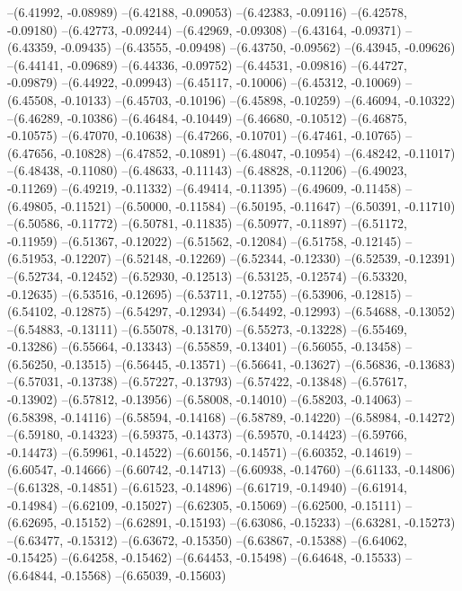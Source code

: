 --(6.41992, -0.08989)
--(6.42188, -0.09053)
--(6.42383, -0.09116)
--(6.42578, -0.09180)
--(6.42773, -0.09244)
--(6.42969, -0.09308)
--(6.43164, -0.09371)
--(6.43359, -0.09435)
--(6.43555, -0.09498)
--(6.43750, -0.09562)
--(6.43945, -0.09626)
--(6.44141, -0.09689)
--(6.44336, -0.09752)
--(6.44531, -0.09816)
--(6.44727, -0.09879)
--(6.44922, -0.09943)
--(6.45117, -0.10006)
--(6.45312, -0.10069)
--(6.45508, -0.10133)
--(6.45703, -0.10196)
--(6.45898, -0.10259)
--(6.46094, -0.10322)
--(6.46289, -0.10386)
--(6.46484, -0.10449)
--(6.46680, -0.10512)
--(6.46875, -0.10575)
--(6.47070, -0.10638)
--(6.47266, -0.10701)
--(6.47461, -0.10765)
--(6.47656, -0.10828)
--(6.47852, -0.10891)
--(6.48047, -0.10954)
--(6.48242, -0.11017)
--(6.48438, -0.11080)
--(6.48633, -0.11143)
--(6.48828, -0.11206)
--(6.49023, -0.11269)
--(6.49219, -0.11332)
--(6.49414, -0.11395)
--(6.49609, -0.11458)
--(6.49805, -0.11521)
--(6.50000, -0.11584)
--(6.50195, -0.11647)
--(6.50391, -0.11710)
--(6.50586, -0.11772)
--(6.50781, -0.11835)
--(6.50977, -0.11897)
--(6.51172, -0.11959)
--(6.51367, -0.12022)
--(6.51562, -0.12084)
--(6.51758, -0.12145)
--(6.51953, -0.12207)
--(6.52148, -0.12269)
--(6.52344, -0.12330)
--(6.52539, -0.12391)
--(6.52734, -0.12452)
--(6.52930, -0.12513)
--(6.53125, -0.12574)
--(6.53320, -0.12635)
--(6.53516, -0.12695)
--(6.53711, -0.12755)
--(6.53906, -0.12815)
--(6.54102, -0.12875)
--(6.54297, -0.12934)
--(6.54492, -0.12993)
--(6.54688, -0.13052)
--(6.54883, -0.13111)
--(6.55078, -0.13170)
--(6.55273, -0.13228)
--(6.55469, -0.13286)
--(6.55664, -0.13343)
--(6.55859, -0.13401)
--(6.56055, -0.13458)
--(6.56250, -0.13515)
--(6.56445, -0.13571)
--(6.56641, -0.13627)
--(6.56836, -0.13683)
--(6.57031, -0.13738)
--(6.57227, -0.13793)
--(6.57422, -0.13848)
--(6.57617, -0.13902)
--(6.57812, -0.13956)
--(6.58008, -0.14010)
--(6.58203, -0.14063)
--(6.58398, -0.14116)
--(6.58594, -0.14168)
--(6.58789, -0.14220)
--(6.58984, -0.14272)
--(6.59180, -0.14323)
--(6.59375, -0.14373)
--(6.59570, -0.14423)
--(6.59766, -0.14473)
--(6.59961, -0.14522)
--(6.60156, -0.14571)
--(6.60352, -0.14619)
--(6.60547, -0.14666)
--(6.60742, -0.14713)
--(6.60938, -0.14760)
--(6.61133, -0.14806)
--(6.61328, -0.14851)
--(6.61523, -0.14896)
--(6.61719, -0.14940)
--(6.61914, -0.14984)
--(6.62109, -0.15027)
--(6.62305, -0.15069)
--(6.62500, -0.15111)
--(6.62695, -0.15152)
--(6.62891, -0.15193)
--(6.63086, -0.15233)
--(6.63281, -0.15273)
--(6.63477, -0.15312)
--(6.63672, -0.15350)
--(6.63867, -0.15388)
--(6.64062, -0.15425)
--(6.64258, -0.15462)
--(6.64453, -0.15498)
--(6.64648, -0.15533)
--(6.64844, -0.15568)
--(6.65039, -0.15603)
